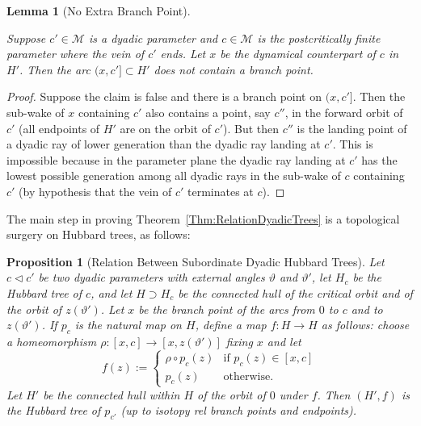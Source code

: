 \documentclass[12pt]{amsart}
\newcommand{\M}{\mathscr M}
\newcommand{\0}{\texttt{0}}
\newcommand{\1}{\texttt{1}}
\newtheorem{lemma}[theorem]{Lemma}
\newtheorem{proposition}[theorem]{Proposition}
\theoremstyle{definition}
\numberwithin{equation}{section}
\renewcommand{\theta}{\vartheta}
\newcommand{\lineclear}{\rule{0pt}{2pt}\newline}
\begin{document}

\begin{lemma}[No Extra Branch Point]
\label{Lem:NoExtraBranchPoint} \lineclear
Suppose $c'\in\M$ is a dyadic parameter and $c\in\M$ is the postcritically finite parameter where the vein of $c'$ ends. Let $x$ be the dynamical counterpart of $c$ in $H'$. Then 
the arc $(x,c']\subset H'$ does not contain a branch point.
\end{lemma}
\begin{proof}
Suppose the claim is false and there is a branch point on $(x,c']$. Then the sub-wake of $x$ containing $c'$ also contains a point, say $c''$, in the forward orbit of $c'$ (all endpoints of $H'$ are on the orbit of $c'$). But then $c''$ is the landing point of a dyadic ray of lower generation than the dyadic ray landing at $c'$. This is impossible because in the parameter plane the dyadic ray landing at $c'$ has the lowest possible generation among all dyadic rays in the sub-wake of $c$ containing $c'$ (by hypothesis that the vein of $c'$ terminates at $c$).  
\end{proof}


The main step in proving Theorem~\ref{Thm:RelationDyadicTrees} is a topological surgery on Hubbard trees, as follows: 



\begin{proposition}[Relation Between Subordinate Dyadic Hubbard Trees]
\label{Prop:RelationDyadicTrees} %
Let $c\lhd c'$ be two dyadic parameters with external angles $\theta$ and $\theta'$, let $H_c$ be the Hubbard tree of $c$, and let $H \supset H_c$ be the connected hull of the critical orbit and of the orbit of $z(\theta')$. Let $x$ be the branch point of the arcs from $0$ to $c$ and to $z(\theta')$. If $p_c$ is the natural map on $H$, define a map $f\colon H\to H$ as follows: choose a homeomorphism $\rho\colon[x,c]\to[x,z(\theta')]$ fixing $x$ and let 
\[
f(z):=\left\{ \begin{array}{ll} \rho\circ p_c(z) & \text{if $p_c(z)\in[x,c]$} \\ 
p_c(z) & \text{otherwise.} \end{array} \right.
\]
Let $H'$ be the connected hull within $H$ of the orbit of $0$ under $f$. Then $(H',f)$ is the Hubbard tree of $p_{c'}$ (up to isotopy rel branch points and endpoints).
\end{proposition}
\end{document}

